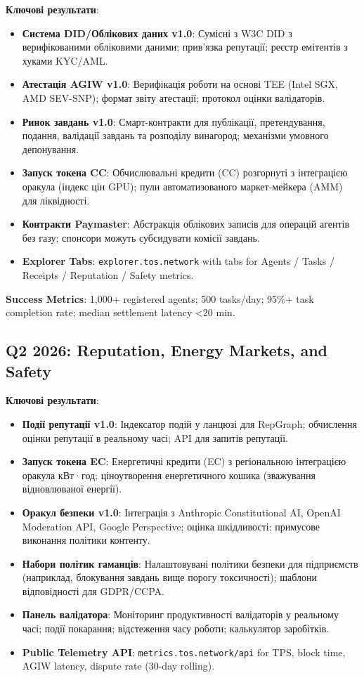\documentclass[11pt]{article}
\begin{document}
\textbf{Ключові результати}:
\begin{itemize}[noitemsep]
  \item \textbf{Система DID/Облікових даних v1.0}: Сумісні з W3C DID з верифікованими обліковими даними; прив'язка репутації; реєстр емітентів з хуками KYC/AML.
  \item \textbf{Атестація AGIW v1.0}: Верифікація роботи на основі TEE (Intel SGX, AMD SEV-SNP); формат звіту атестації; протокол оцінки валідаторів.
  \item \textbf{Ринок завдань v1.0}: Смарт-контракти для публікації, претендування, подання, валідації завдань та розподілу винагород; механізми умовного депонування.
  \item \textbf{Запуск токена CC}: Обчислювальні кредити (CC) розгорнуті з інтеграцією оракула (індекс цін GPU); пули автоматизованого маркет-мейкера (AMM) для ліквідності.
  \item \textbf{Контракти Paymaster}: Абстракція облікових записів для операцій агентів без газу; спонсори можуть субсидувати комісії завдань.
  \item \textbf{Explorer Tabs}: \texttt{explorer.tos.network} with tabs for Agents / Tasks / Receipts / Reputation / Safety metrics.
\end{itemize}

\textbf{Success Metrics}: 1,000+ registered agents; 500 tasks/day; 95\%+ task completion rate; median settlement latency <20 min.

\subsection{Q2 2026: Reputation, Energy Markets, and Safety}

\textbf{Ключові результати}:
\begin{itemize}[noitemsep]
  \item \textbf{Події репутації v1.0}: Індексатор подій у ланцюзі для RepGraph; обчислення оцінки репутації в реальному часі; API для запитів репутації.
  \item \textbf{Запуск токена EC}: Енергетичні кредити (EC) з регіональною інтеграцією оракула кВт·год; ціноутворення енергетичного кошика (зважування відновлюваної енергії).
  \item \textbf{Оракул безпеки v1.0}: Інтеграція з Anthropic Constitutional AI, OpenAI Moderation API, Google Perspective; оцінка шкідливості; примусове виконання політики контенту.
  \item \textbf{Набори політик гаманців}: Налаштовувані політики безпеки для підприємств (наприклад, блокування завдань вище порогу токсичності); шаблони відповідності для GDPR/CCPA.
  \item \textbf{Панель валідатора}: Моніторинг продуктивності валідаторів у реальному часі; події покарання; відстеження часу роботи; калькулятор заробітків.
  \item \textbf{Public Telemetry API}: \texttt{metrics.tos.network/api} for TPS, block time, AGIW latency, dispute rate (30-day rolling).
\end{itemize}
\end{document}
